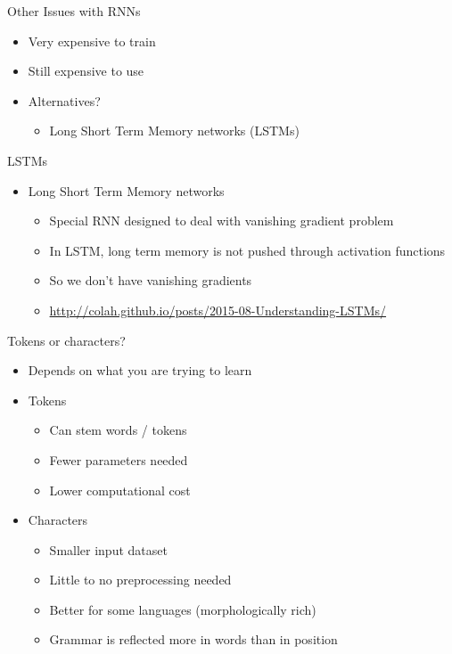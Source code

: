\documentclass[aspectratio=169]{beamer}
\begin{document}
\begin{frame}{Other Issues with RNNs}

\begin{itemize}
	\item Very expensive to train
	\item Still expensive to use
	\item Alternatives?
	\begin{itemize}
	\item Long Short Term Memory networks (LSTMs) 
	\end{itemize}

\end{itemize}

\end{frame}
\begin{frame}{LSTMs}

\begin{itemize} 
	\item Long Short Term Memory networks
	\begin{itemize}
	\item Special RNN designed to deal with vanishing gradient problem
	\item In LSTM, long term memory is not pushed through activation functions
	\item So we don't have vanishing gradients
	\item \url{http://colah.github.io/posts/2015-08-Understanding-LSTMs/}
	\end{itemize}
\end{itemize}
\end{frame}

\begin{frame}{Tokens or characters?}
\begin{itemize}
\item Depends on what you are trying to learn
\item Tokens
\begin{itemize}
	\item Can stem words / tokens
	\item Fewer parameters needed 
	\item Lower computational cost
\end{itemize}
\item Characters
\begin{itemize}
	\item Smaller input dataset 
	\item Little to no preprocessing needed
	\item Better for some languages (morphologically rich)
	\item Grammar is reflected more in words than in position
\end{itemize}
\end{itemize}


\end{frame}
\end{document}
